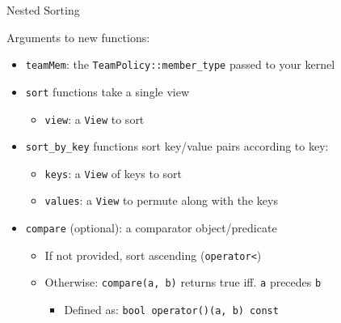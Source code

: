 
\begin{frame}[fragile]{Nested Sorting}

Arguments to new functions:

\vspace{10pt}

\begin{itemize}
  \item \texttt{teamMem}: the \texttt{TeamPolicy::member\_type} passed to your kernel
  \item \texttt{sort} functions take a single view
  \begin{itemize}
    \item \texttt{view}: a \texttt{View} to sort
  \end{itemize}
  \item \texttt{sort\_by\_key} functions sort key/value pairs according to key:
  \begin{itemize}
    \item \texttt{keys}: a \texttt{View} of keys to sort
    \item \texttt{values}: a \texttt{View} to permute along with the keys
  \end{itemize}
  \item \texttt{compare} (optional): a comparator object/predicate
  \begin{itemize}
    \item If not provided, sort ascending (\texttt{operator<})
    \item Otherwise: \texttt{compare(a, b)} returns true iff. \texttt{a} precedes \texttt{b}
    \begin{itemize}
      \item Defined as: \texttt{bool operator()(a, b) const}
    \end{itemize}
  \end{itemize}
\end{itemize}

\vspace{10pt}

\end{frame}

